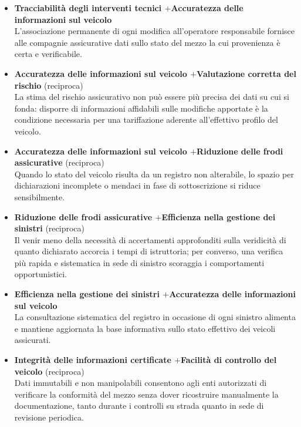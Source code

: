 \begin{itemize}
    \item \textbf{Tracciabilit\`a degli interventi tecnici \quad$+$\quad Accuratezza delle informazioni sul veicolo}\\
    L'associazione permanente di ogni modifica all'operatore responsabile fornisce alle compagnie assicurative dati sullo stato del mezzo la cui provenienza \`e certa e verificabile.

    \item \textbf{Accuratezza delle informazioni sul veicolo \quad$+$\quad Valutazione corretta del rischio} (reciproca)\\
    La stima del rischio assicurativo non pu\`o essere pi\`u precisa dei dati su cui si fonda: disporre di informazioni affidabili sulle modifiche apportate \`e la condizione necessaria per una tariffazione aderente all'effettivo profilo del veicolo.

    \item \textbf{Accuratezza delle informazioni sul veicolo \quad$+$\quad Riduzione delle frodi assicurative} (reciproca)\\
    Quando lo stato del veicolo risulta da un registro non alterabile, lo spazio per dichiarazioni incomplete o mendaci in fase di sottoscrizione si riduce sensibilmente.

    \item \textbf{Riduzione delle frodi assicurative \quad$+$\quad Efficienza nella gestione dei sinistri} (reciproca)\\
    Il venir meno della necessit\`a di accertamenti approfonditi sulla veridicit\`a di quanto dichiarato accorcia i tempi di istruttoria; per converso, una verifica pi\`u rapida e sistematica in sede di sinistro scoraggia i comportamenti opportunistici.

    \item \textbf{Efficienza nella gestione dei sinistri \quad$+$\quad Accuratezza delle informazioni sul veicolo}\\
    La consultazione sistematica del registro in occasione di ogni sinistro alimenta e mantiene aggiornata la base informativa sullo stato effettivo dei veicoli assicurati.

    \item \textbf{Integrit\`a delle informazioni certificate \quad$+$\quad Facilit\`a di controllo del veicolo} (reciproca)\\
    Dati immutabili e non manipolabili consentono agli enti autorizzati di verificare la conformit\`a del mezzo senza dover ricostruire manualmente la documentazione, tanto durante i controlli su strada quanto in sede di revisione periodica.


\end{itemize}
